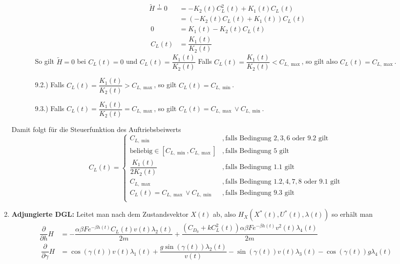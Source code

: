 \begin{enumerate}
\begin{enumerate}
\begin{enumerate}
\[\begin{split}
\tilde{H} \stackrel{!}{=} 0 &= - K_2(t) C_L^2(t) + K_1(t)C_L(t) \\\
&= (- K_2(t) C_L(t) + K_1(t)) C_L(t) \\\
0 &= K_1(t) - K_2(t)C_L(t) \\\
C_L(t) &= \dfrac{K_1(t)}{K_2(t)}
\end{split}\]
So gilt $\tilde{H} = 0$ bei $C_L(t) = 0$ und $C_L(t) = \dfrac{K_1(t)}{K_2(t)}$ Falls $C_L(t) = \dfrac{K_1(t)}{K_2(t)} < C_{L,\max}$, so gilt also $C_L(t) = C_{L, \max}$.
%
\item[9.2.)] Falls $C_L(t) = \dfrac{K_1(t)}{K_2(t)} > C_{L,\max}$, so gilt $C_L(t) = C_{L,\min}$.
\item[9.3.)] Falls $C_L(t) = \dfrac{K_1(t)}{K_2(t)} = C_{L,\max}$, so gilt $C_L(t) = C_{L,\max} \vee C_{L,\min}$.
\end{enumerate}
\end{enumerate}
Damit folgt für die Steuerfunktion des Auftriebsbeiwerts
\begin{equation}\label{func:SynAuftrieb}
C_L(t) = \left\lbrace 
\begin{array}{ll}
C_{L, \min} & ,\text{falls Bedingung } 2,3,6 \text{ oder } 9.2 \text{ gilt} \\ 
\text{beliebig} \in [C_{L, \min},C_{L, \max}] & ,\text{falls Bedingung } 5 \text{ gilt} \\ 
\dfrac{K_1(t)}{2 K_2(t)} & ,\text{falls Bedingung } 1.1 \text{ gilt} \\ 
C_{L, \max} & ,\text{falls Bedingung } 1.2,4,7,8 \text{ oder } 9.1 \text{ gilt} \\
C_L(t) = C_{L,\max} \vee C_{L,\min} & ,\text{falls Bedingung } 9.3 \text{ gilt} \\ 
\end{array} 
\right.
\end{equation}
%
\item \textbf{Adjungierte DGL:} Leitet man nach dem Zustandsvektor $X(t)$ ab, also $H_{X}(X^{\ast}(t),U^{\ast}(t),\lambda(t))$ so erhält man
\begin{equation}\label{func:AjgDGL}
\begin{split}
\dfrac{\partial}{\partial h} H &= - \dfrac{\alpha \beta F e^{-\beta h(t)} C_L(t) v(t) \lambda_2(t)}{2m} + \dfrac{(C_{D_0}+k C_L^2(t)) \alpha \beta F e^{-\beta h(t)} v^2(t) \lambda_4(t)}{2m} \\\
\dfrac{\partial}{\partial \gamma} H &= \cos(\gamma(t)) v(t) \lambda_1(t) + \dfrac{g \sin(\gamma(t)) \lambda_2(t)}{v(t)} - \sin(\gamma(t)) v(t) \lambda_3(t) - \cos(\gamma(t)) g \lambda_4(t) \\\

\end{split}
\end{equation}
\end{enumerate}
